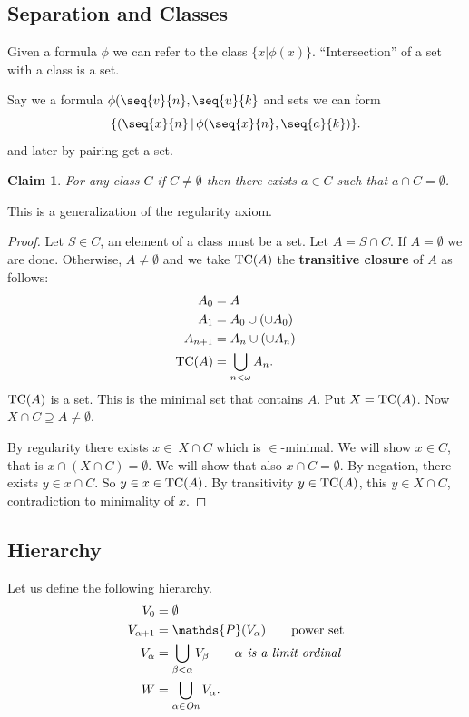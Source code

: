 \documentclass[11pt,pdftex,twoside,a4paper]{article}
\newcommand{\B}[1]{\textbf{#1}}
\newcommand{\On}{\ensuremath{\mathit{On}}}
\newcommand{\TC}{\ensuremath{\mathop{\rm TC}\nolimits}}
\newtheorem{claim}[thm]{Claim}
\theoremstyle{definition}
\begin{document}
\subsection{Separation and Classes}

Given a formula \(\phi\) we can refer to the class \(\{x|\phi(x)\}\).
``Intersection'' of a set with a class is a set.

Say we a formula \(\phi(\seq{v}{n},\seq{u}{k}\)
and sets  we can form
\begin{equation*}
 \{(\seq{x}{n}\,|\,\phi(\seq{x}{n},\seq{a}{k})\}.
\end{equation*}
and later by pairing get a set.

\begin{claim}
For any class $C$ if \(C\neq\emptyset\) then there exists \(a\in C\)
such that \(a\cap C=\emptyset\).
\end{claim}
This is a generalization of the regularity axiom.
\begin{proof}
Let \(S\in C\), an element of a class must be a set.
Let \(A = S\cap C\). If \(A=\emptyset\) we are done.
Otherwise, \(A\neq \emptyset\) and we take \(\TC(A)\)
the \B{transitive closure} of $A$ as follows:
\begin{align*}
A_0 &= A\\
A_1 &= A_0 \cup (\cup A_0) \\
A_{n+1} &= A_n \cup (\cup A_n) \\
\TC(A) &= \bigcup_{n<\omega} A_n.
\end{align*}
\(\TC(A)\) is a set. This is the minimal set that contains $A$.
Put \(X = \TC(A)\). Now \(X \cap C \supseteq A \neq \emptyset\).

By regularity there exists \(x\in\ X \cap C\)
which is \(\in\)-minimal. We will show \(x\in C\), that is
\(x \cap (X\cap C)=\emptyset\). We will show that also
\(x \cap C=\emptyset\). By negation, there exists \(y \in x \cap C\).
So \(y\in x \in \TC(A)\). By transitivity \(y\in \TC(A)\),
this \(y \in X \cap C\), contradiction to minimality of $x$.
\end{proof}

\subsection{Hierarchy}

Let us define the following hierarchy.
\begin{align*}
V_0 &= \emptyset \\
V_{\alpha+1} &= \mathds{P}(V_\alpha) \qquad\textnormal{power set} \\
V_\alpha &= \bigcup_{\beta<\alpha} V_\beta
  \qquad \alpha\ \textit{is a limit ordinal} \\
W &= \bigcup_{\alpha \in \On} V_\alpha.
\end{align*}
\end{document}
